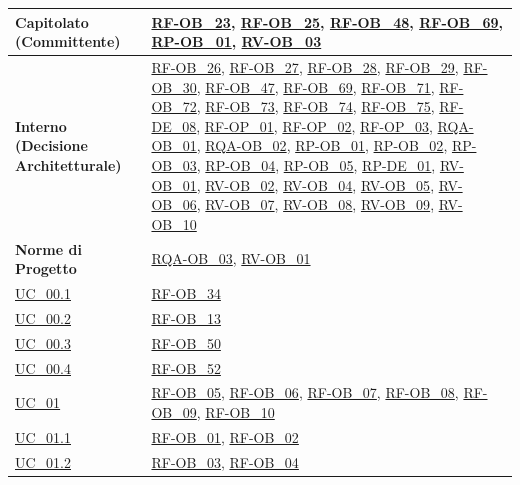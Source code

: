 \begin{longtable}{|>{\raggedright}p{}|>{\raggedright\arraybackslash}p{}|}
    \hline
    \textbf{Capitolato (Committente)} & \hyperlink{rf-ob_23}{RF-OB\_23}, \hyperlink{rf-ob_25}{RF-OB\_25}, \hyperlink{rf-ob_48}{RF-OB\_48}, \hyperlink{rf-ob_69}{RF-OB\_69}, \hyperlink{rp-ob_1}{RP-OB\_01}, \hyperlink{rv-ob_3}{RV-OB\_03} \\
    \hline
    \textbf{Interno (Decisione Architetturale)} & \hyperlink{rf-ob_26}{RF-OB\_26}, \hyperlink{rf-ob_27}{RF-OB\_27}, \hyperlink{rf-ob_28}{RF-OB\_28}, \hyperlink{rf-ob_29}{RF-OB\_29}, \hyperlink{rf-ob_30}{RF-OB\_30}, \hyperlink{rf-ob_47}{RF-OB\_47}, \hyperlink{rf-ob_69}{RF-OB\_69}, \hyperlink{rf-ob_71}{RF-OB\_71}, \hyperlink{rf-ob_72}{RF-OB\_72}, \hyperlink{rf-ob_73}{RF-OB\_73}, \hyperlink{rf-ob_74}{RF-OB\_74}, \hyperlink{rf-ob_75}{RF-OB\_75}, \hyperlink{rf-de_8}{RF-DE\_08}, \hyperlink{rf-op_1}{RF-OP\_01}, \hyperlink{rf-op_2}{RF-OP\_02}, \hyperlink{rf-op_3}{RF-OP\_03}, \hyperlink{rqa-ob_1}{RQA-OB\_01}, \hyperlink{rqa-ob_2}{RQA-OB\_02}, \hyperlink{rp-ob_1}{RP-OB\_01}, \hyperlink{rp-ob_2}{RP-OB\_02}, \hyperlink{rp-ob_3}{RP-OB\_03}, \hyperlink{rp-ob_4}{RP-OB\_04}, \hyperlink{rp-ob_5}{RP-OB\_05}, \hyperlink{rp-de_1}{RP-DE\_01}, \hyperlink{rv-ob_1}{RV-OB\_01}, \hyperlink{rv-ob_2}{RV-OB\_02}, \hyperlink{rv-ob_4}{RV-OB\_04}, \hyperlink{rv-ob_5}{RV-OB\_05}, \hyperlink{rv-ob_6}{RV-OB\_06}, \hyperlink{rv-ob_7}{RV-OB\_07}, \hyperlink{rv-ob_8}{RV-OB\_08}, \hyperlink{rv-ob_9}{RV-OB\_09}, \hyperlink{rv-ob_10}{RV-OB\_10} \\
    \hline
    \textbf{Norme di Progetto} & \hyperlink{rqa-ob_3}{RQA-OB\_03}, \hyperlink{rv-ob_1}{RV-OB\_01} \\
    \hline
    \hyperref[uc_00.1]{UC\_00.1} & \hyperlink{rf-ob_34}{RF-OB\_34} \\
    \hline
    \hyperref[uc_00.2]{UC\_00.2} & \hyperlink{rf-ob_13}{RF-OB\_13} \\
    \hline
    \hyperref[uc_00.3]{UC\_00.3} & \hyperlink{rf-ob_50}{RF-OB\_50} \\
    \hline
    \hyperref[uc_00.4]{UC\_00.4} & \hyperlink{rf-ob_52}{RF-OB\_52} \\
    \hline
    \hyperref[uc_01]{UC\_01} & \hyperlink{rf-ob_5}{RF-OB\_05}, \hyperlink{rf-ob_6}{RF-OB\_06}, \hyperlink{rf-ob_7}{RF-OB\_07}, \hyperlink{rf-ob_8}{RF-OB\_08}, \hyperlink{rf-ob_9}{RF-OB\_09}, \hyperlink{rf-ob_10}{RF-OB\_10} \\
    \hline
    \hyperref[uc_01.1]{UC\_01.1} & \hyperlink{rf-ob_1}{RF-OB\_01}, \hyperlink{rf-ob_2}{RF-OB\_02} \\
    \hline
    \hyperref[uc_01.2]{UC\_01.2} & \hyperlink{rf-ob_3}{RF-OB\_03}, \hyperlink{rf-ob_4}{RF-OB\_04} \\

\end{longtable}
